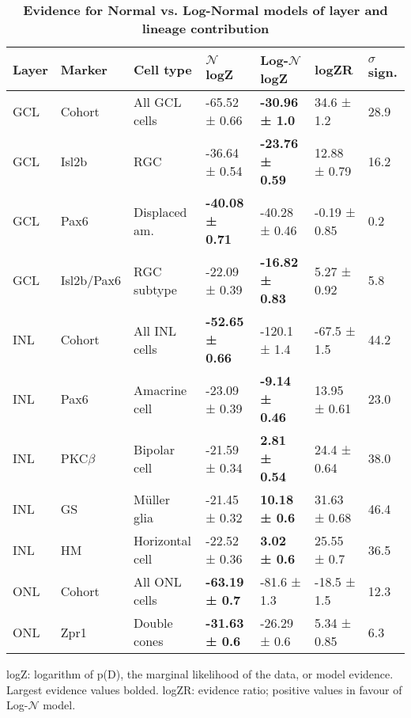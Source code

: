 \begin{table}[!ht]
    \caption{{\bf Evidence for Normal vs. Log-Normal models of layer and lineage contribution}}
    \begin{tabular}{|l|l|l|l|l|l|l|} 
        \hline
        {\bf Layer} & {\bf Marker} & {\bf Cell type} & {\bf $\mathcal{N}$ logZ} & {\bf Log-$\mathcal{N}$ logZ} & {\bf logZR} & {\bf $\sigma$ sign.}\\ \hline \hline
        GCL & Cohort & All GCL cells &  -65.52 ± 0.66 & {\bf -30.96 ± 1.0} & 34.6 ± 1.2 & 28.9\\ \hline
        GCL & Isl2b & RGC & -36.64 ± 0.54 & {\bf -23.76 ± 0.59} & 12.88 ± 0.79 & 16.2\\ \hline
        GCL & Pax6 & Displaced am. & {\bf -40.08 ± 0.71} & -40.28 ± 0.46 & -0.19 ± 0.85 & 0.2\\ \hline
        GCL & Isl2b/Pax6 & RGC subtype & -22.09 ± 0.39 & {\bf -16.82 ± 0.83} & 5.27 ± 0.92 & 5.8\\ \hline \hline
        INL & Cohort & All INL cells & {\bf -52.65 ± 0.66} & -120.1 ± 1.4 & -67.5 ± 1.5 & 44.2\\ \hline
        INL & Pax6 & Amacrine cell & -23.09 ± 0.39 & {\bf -9.14 ± 0.46} & 13.95 ± 0.61 & 23.0\\ \hline
        INL & PKC$\beta$ & Bipolar cell & -21.59 ± 0.34 & {\bf 2.81 ± 0.54} & 24.4 ± 0.64 & 38.0\\ \hline
        INL & GS & M\"{u}ller glia & -21.45 ± 0.32 & {\bf 10.18 ± 0.6} & 31.63 ± 0.68 & 46.4\\ \hline
        INL & HM & Horizontal cell & -22.52 ± 0.36 & {\bf 3.02 ± 0.6} & 25.55 ± 0.7 & 36.5\\ \hline \hline
        ONL & Cohort & All ONL cells &{\bf -63.19 ± 0.7} & -81.6 ± 1.3 & -18.5 ± 1.5 & 12.3\\ \hline
        ONL & Zpr1 & Double cones &  {\bf -31.63 ± 0.6} & -26.29 ± 0.6 & 5.34 ± 0.85 & 6.3\\ \hline
    \end{tabular}
    \begin{flushleft}logZ: logarithm of p(D), the marginal likelihood of the data, or model evidence.  Largest evidence values bolded. logZR: evidence ratio; positive values in favour of Log-$\mathcal{N}$ model.
    \end{flushleft}
    \label{lineage_nlnev}
\end{table}

